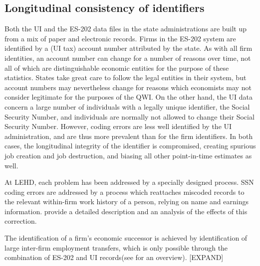   



\subsection{Longitudinal consistency of identifiers}
\label{sec:coding}


Both the UI and the ES-202 data files in the state administrations
are built up from a mix of paper and electronic records. Firms in the
ES-202 system are identified by a (UI tax) account number attributed by the
state. As with all firm identities, an account number can change for a
number of reasons over time, not all of which are distinguishable economic
entities for the purpose of these statistics. States take great care to
follow the legal entities in their system, but account numbers may
nevertheless change for reasons which economists may not consider
legitimate for the purposes of the QWI.
%
On the other hand, the UI data concern a large number of individuals with a
legally unique identifier, the Social Security Number, and individuals are
normally not allowed to change their Social Security Number. However,
coding errors are less well identified by the UI administration, and are
thus more prevalent than for the firm identifiers.
%
In both cases, the longitudinal integrity of the identifier is
compromised, creating spurious job creation and job destruction, and
biasing all other point-in-time estimates as well.

 At LEHD, each problem has been addressed by a specially
designed process. SSN coding errors are addressed by a process which
reattaches miscoded records to the relevant within-firm work history of a
person, relying on name and earnings information.
\Cite{AbowdVilhuber2005} provide a detailed description and an analysis of
the effects of this correction. 

The identification of a
firm's economic successor is achieved by identification of large inter-firm
employment transfers, which is only possible through the combination of
ES-202 and UI records(see \Cite{tp2002-04} for an overview).
%
%
              [EXPAND]
%
%


